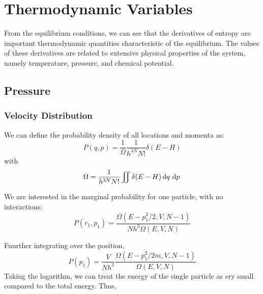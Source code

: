 \chapter{Thermodynamic Variables}
From the equilibrium conditions, we can see that the derivatives of entropy are important thermodynamic quantities characteristic of the equilibrium. The values of these derivatives are related to extensive physical properties of the system, namely temperature, pressure, and chemical potential.

\section{Pressure}
\subsection{Velocity Distribution}
We can define the probability density of all locations and momenta as:
\begin{equation}
	P(q,p)= \frac{1}{\Omega}\frac{1}{h^{3N}N!}\delta(E-H)
\end{equation}
with
\begin{equation}
	\Omega = \frac{1}{h^{3N}N!} \iint\delta(E-H)\d{q}\d p
\end{equation}

We are interested in the marginal probability for one particle, with no interactions:
\begin{equation}
	P(r_1, p_1) = \frac{\Omega (E-p^2_1/2, V, N-1)}{Nh^3\Omega(E,V,N)}
\end{equation}

Fuurther integrating over the position,
\begin{equation}
	P(p_1)=\frac{V}{Nh^3}\frac{\Omega (E-p^2_1/2m, V, N-1)}{\Omega(E,V,N)}
\end{equation}
Taking the logarithm, we can treat the energy of the single particle as ery small compared to the total energy. Thus,

